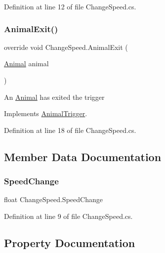 Definition at line 12 of file Change\+Speed.\+cs.

\mbox{\label{class_change_speed_ac708140d2ba20cf5bb4307a23f5987dd}} 
\subsubsection{\texorpdfstring{Animal\+Exit()}{AnimalExit()}}
{\footnotesize\ttfamily override void Change\+Speed.\+Animal\+Exit (\begin{DoxyParamCaption}\item[{\mbox{\hyperlink{class_animal}{Animal}}}]{animal }\end{DoxyParamCaption})\hspace{0.3cm}{\ttfamily [virtual]}}



An \mbox{\hyperlink{class_animal}{Animal}} has exited the trigger 



Implements \mbox{\hyperlink{class_animal_trigger_aa1a7c2e90de76c2e089b2bae01813f5c}{Animal\+Trigger}}.



Definition at line 18 of file Change\+Speed.\+cs.



\subsection{Member Data Documentation}
\mbox{\label{class_change_speed_a8fd2a0a4490f2b9b08d4d8978c60d47b}} 
\subsubsection{\texorpdfstring{Speed\+Change}{SpeedChange}}
{\footnotesize\ttfamily float Change\+Speed.\+Speed\+Change}



Definition at line 9 of file Change\+Speed.\+cs.



\subsection{Property Documentation}
\mbox{\label{class_change_speed_ac9a7eb2aaa6053d3a08f7a0c3bc590a7}} 
